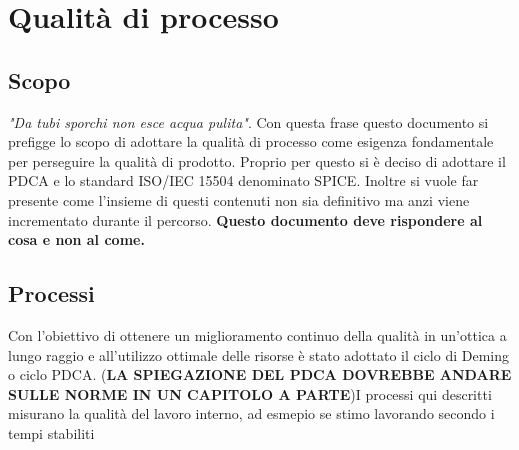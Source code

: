 \section{Qualità di processo}
\subsection{Scopo}
\textit{"Da tubi sporchi non esce acqua pulita"}.
\newline
Con questa frase questo documento si prefigge  lo scopo di adottare la qualità di processo come esigenza fondamentale per perseguire la qualità di prodotto. Proprio per questo si è deciso di adottare il PDCA e lo standard ISO/IEC 15504 denominato SPICE. Inoltre si vuole far presente come l'insieme di questi contenuti non sia definitivo ma anzi viene incrementato durante il percorso. \textbf{Questo documento deve rispondere al cosa e non al come.}
\subsection{Processi}
Con l'obiettivo di ottenere un miglioramento continuo della qualità in un'ottica a lungo raggio e all'utilizzo ottimale delle risorse è stato adottato il ciclo di Deming o ciclo PDCA. (\textbf{LA SPIEGAZIONE DEL PDCA DOVREBBE ANDARE SULLE NORME IN UN CAPITOLO A PARTE})\newline I processi qui descritti misurano la qualità del lavoro interno, ad esmepio se stimo lavorando secondo i tempi stabiliti

